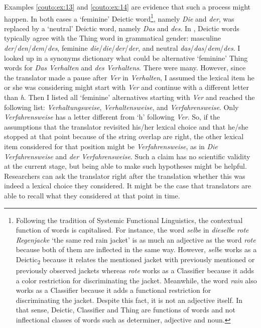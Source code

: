 \documentclass[output=paper]{LSP/langsci}
\begin{document}
Examples \ref{couto:ex:13} and \ref{couto:ex:14} are evidence that such a process might happen. In both cases a `feminine' Deictic word\footnote{Following the tradition of Systemic Functional Linguistics, the contextual function of words is capitalised. For instance, the word \emph{selbe} in \emph{dieselbe rote Regenjacke} `the same red rain jacket' is as much an adjective as the word \emph{rote} because both of them are inflected in the same way. However, \emph{selbe} works as a Deictic\textsubscript{2} because it relates the mentioned jacket with previously mentioned or previously observed jackets whereas \emph{rote} works as a Classifier because it adds a color restriction for discriminating the jacket. Meanwhile, the word \emph{rain} also works as a Classifier because it adds a functional restriction for discriminating the jacket. Despite this fact, it is not an adjective itself. In that sense, Deictic, Classifier and Thing are functions of words and not inflectional classes of words such as determiner, adjective and noun.}, namely \emph{Die} and \emph{der}, was replaced by a `neutral' Deictic word, namely \emph{Das} and \emph{des}. In , Deictic words typically agree with the Thing word in grammatical gender: masculine \emph{der}/\emph{den}/\emph{dem}/\emph{des}, feminine \emph{die}/\emph{die}/\emph{der}/\emph{der}, and neutral \emph{das}/\emph{das}/\emph{dem}/\emph{des}. I looked up in a synonyms dictionary what could be alternative `feminine' Thing words for \emph{Das Verhalten} and \emph{des Verhaltens}. There were many. However, since the translator made a pause after \emph{Ver} in \emph{Verhalten}, I assumed the lexical item he or she was considering might start with \emph{Ver} and continue with a different letter than \emph{h}. Then I listed all `feminine' alternatives starting with \emph{Ver} and reached the following list: \emph{Verhaltungsweise}, \emph{Verhaltensweise}, and \emph{Verfahrensweise}. Only \emph{Verfahrensweise} has a letter different from `h' following \emph{Ver}. So, if the assumptions that the translator revisited his/her lexical choice and that he/she stopped at that point because of the string overlap are right, the other lexical item considered for that position might be \emph{Verfahrensweise}, as in \emph{Die Verfahrensweise} and \emph{der Verfahrensweise}.
Such a claim has no scientific validity at the current stage, but being able to make such hypotheses might be helpful. Researchers can ask the translator right after the translation whether this was indeed a lexical choice they considered. It might be the case that translators are able to recall what they considered at that point in time.
\end{document}
